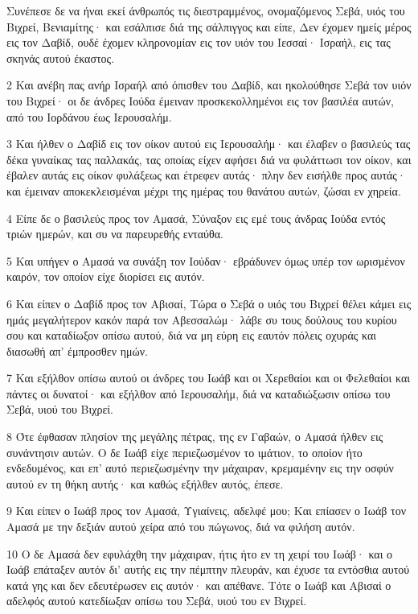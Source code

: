 \par Συνέπεσε δε να ήναι εκεί άνθρωπός τις διεστραμμένος, ονομαζόμενος Σεβά, υιός του Βιχρεί, Βενιαμίτης· και εσάλπισε διά της σάλπιγγος και είπε, Δεν έχομεν ημείς μέρος εις τον Δαβίδ, ουδέ έχομεν κληρονομίαν εις τον υιόν του Ιεσσαί· Ισραήλ, εις τας σκηνάς αυτού έκαστος.
\par 2 Και ανέβη πας ανήρ Ισραήλ από όπισθεν του Δαβίδ, και ηκολούθησε Σεβά τον υιόν του Βιχρεί· οι δε άνδρες Ιούδα έμειναν προσκεκολλημένοι εις τον βασιλέα αυτών, από του Ιορδάνου έως Ιερουσαλήμ.
\par 3 Και ήλθεν ο Δαβίδ εις τον οίκον αυτού εις Ιερουσαλήμ· και έλαβεν ο βασιλεύς τας δέκα γυναίκας τας παλλακάς, τας οποίας είχεν αφήσει διά να φυλάττωσι τον οίκον, και έβαλεν αυτάς εις οίκον φυλάξεως και έτρεφεν αυτάς· πλην δεν εισήλθε προς αυτάς· και έμειναν αποκεκλεισμέναι μέχρι της ημέρας του θανάτου αυτών, ζώσαι εν χηρεία.
\par 4 Είπε δε ο βασιλεύς προς τον Αμασά, Σύναξον εις εμέ τους άνδρας Ιούδα εντός τριών ημερών, και συ να παρευρεθής ενταύθα.
\par 5 Και υπήγεν ο Αμασά να συνάξη τον Ιούδαν· εβράδυνεν όμως υπέρ τον ωρισμένον καιρόν, τον οποίον είχε διορίσει εις αυτόν.
\par 6 Και είπεν ο Δαβίδ προς τον Αβισαί, Τώρα ο Σεβά ο υιός του Βιχρεί θέλει κάμει εις ημάς μεγαλήτερον κακόν παρά τον Αβεσσαλώμ· λάβε συ τους δούλους του κυρίου σου και καταδίωξον οπίσω αυτού, διά να μη εύρη εις εαυτόν πόλεις οχυράς και διασωθή απ' έμπροσθεν ημών.
\par 7 Και εξήλθον οπίσω αυτού οι άνδρες του Ιωάβ και οι Χερεθαίοι και οι Φελεθαίοι και πάντες οι δυνατοί· και εξήλθον από Ιερουσαλήμ, διά να καταδιώξωσιν οπίσω του Σεβά, υιού του Βιχρεί.
\par 8 Ότε έφθασαν πλησίον της μεγάλης πέτρας, της εν Γαβαών, ο Αμασά ήλθεν εις συνάντησιν αυτών. Ο δε Ιωάβ είχε περιεζωσμένον το ιμάτιον, το οποίον ήτο ενδεδυμένος, και επ' αυτό περιεζωσμένην την μάχαιραν, κρεμαμένην εις την οσφύν αυτού εν τη θήκη αυτής· και καθώς εξήλθεν αυτός, έπεσε.
\par 9 Και είπεν ο Ιωάβ προς τον Αμασά, Υγιαίνεις, αδελφέ μου; Και επίασεν ο Ιωάβ τον Αμασά με την δεξιάν αυτού χείρα από του πώγωνος, διά να φιλήση αυτόν.
\par 10 Ο δε Αμασά δεν εφυλάχθη την μάχαιραν, ήτις ήτο εν τη χειρί του Ιωάβ· και ο Ιωάβ επάταξεν αυτόν δι' αυτής εις την πέμπτην πλευράν, και έχυσε τα εντόσθια αυτού κατά γης και δεν εδευτέρωσεν εις αυτόν· και απέθανε. Τότε ο Ιωάβ και Αβισαί ο αδελφός αυτού κατεδίωξαν οπίσω του Σεβά, υιού του εν Βιχρεί.
